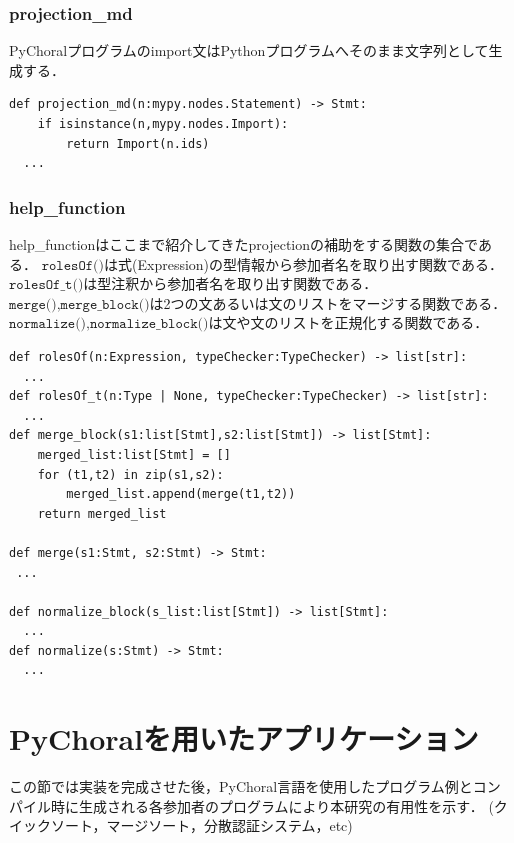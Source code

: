 \documentclass{thesis}
\begin{document}
\subsection{projection\_md}
PyChoralプログラムのimport文はPythonプログラムへそのまま文字列として生成する．
\begin{lstlisting}[caption=pro\_md.py]
def projection_md(n:mypy.nodes.Statement) -> Stmt:
    if isinstance(n,mypy.nodes.Import):
        return Import(n.ids)
  ... 
\end{lstlisting}
\subsection{help\_function}
help\_functionはここまで紹介してきたprojectionの補助をする関数の集合である．
$\texttt{rolesOf()}$は式(\textsf{Expression})の型情報から参加者名を取り出す関数である．
$\texttt{rolesOf\_t()}$は型注釈から参加者名を取り出す関数である．
$\texttt{merge(),merge\_block()}$は2つの文あるいは文のリストをマージする関数である．
$\texttt{normalize(),normalize\_block()}$は文や文のリストを正規化する関数である．
\begin{lstlisting}[caption=help\_func.py]
def rolesOf(n:Expression, typeChecker:TypeChecker) -> list[str]:
  ... 
def rolesOf_t(n:Type | None, typeChecker:TypeChecker) -> list[str]:
  ... 
def merge_block(s1:list[Stmt],s2:list[Stmt]) -> list[Stmt]:
    merged_list:list[Stmt] = []
    for (t1,t2) in zip(s1,s2):
        merged_list.append(merge(t1,t2))
    return merged_list

def merge(s1:Stmt, s2:Stmt) -> Stmt: 
 ... 

def normalize_block(s_list:list[Stmt]) -> list[Stmt]:
  ... 
def normalize(s:Stmt) -> Stmt:
  ... 
\end{lstlisting}
\chapter{PyChoralを用いたアプリケーション}
この節では実装を完成させた後，PyChoral言語を使用したプログラム例とコンパイル時に生成される各参加者のプログラムにより本研究の有用性を示す．
(クイックソート，マージソート，分散認証システム，etc)

\end{document}
